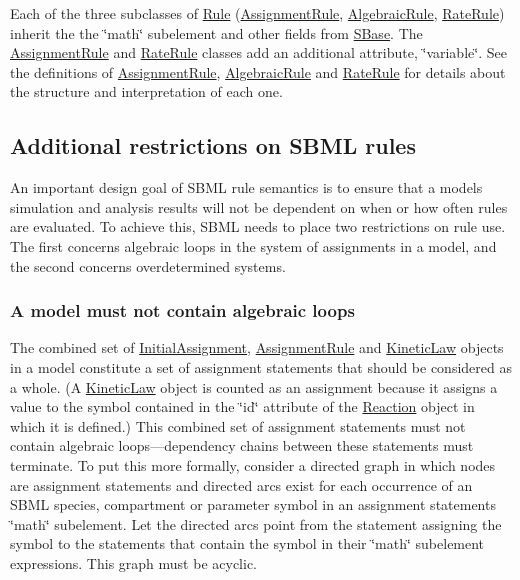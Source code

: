 Each of the three subclasses of \hyperlink{class_rule}{Rule} (\hyperlink{class_assignment_rule}{Assignment\+Rule}, \hyperlink{class_algebraic_rule}{Algebraic\+Rule}, \hyperlink{class_rate_rule}{Rate\+Rule}) inherit the the \char`\"{}math\char`\"{} subelement and other fields from \hyperlink{class_s_base}{S\+Base}. The \hyperlink{class_assignment_rule}{Assignment\+Rule} and \hyperlink{class_rate_rule}{Rate\+Rule} classes add an additional attribute, \char`\"{}variable\char`\"{}. See the definitions of \hyperlink{class_assignment_rule}{Assignment\+Rule}, \hyperlink{class_algebraic_rule}{Algebraic\+Rule} and \hyperlink{class_rate_rule}{Rate\+Rule} for details about the structure and interpretation of each one.\hypertarget{classdoc__rules__general__summary_rules-restrictions}{}\subsection{Additional restrictions on S\+B\+M\+L rules}\label{classdoc__rules__general__summary_rules-restrictions}
An important design goal of S\+B\+ML rule semantics is to ensure that a model\textquotesingle{}s simulation and analysis results will not be dependent on when or how often rules are evaluated. To achieve this, S\+B\+ML needs to place two restrictions on rule use. The first concerns algebraic loops in the system of assignments in a model, and the second concerns overdetermined systems.\hypertarget{classdoc__rules__general__summary_rules-no-loops}{}\subsubsection{A model must not contain algebraic loops}\label{classdoc__rules__general__summary_rules-no-loops}
The combined set of \hyperlink{class_initial_assignment}{Initial\+Assignment}, \hyperlink{class_assignment_rule}{Assignment\+Rule} and \hyperlink{class_kinetic_law}{Kinetic\+Law} objects in a model constitute a set of assignment statements that should be considered as a whole. (A \hyperlink{class_kinetic_law}{Kinetic\+Law} object is counted as an assignment because it assigns a value to the symbol contained in the \char`\"{}id\char`\"{} attribute of the \hyperlink{class_reaction}{Reaction} object in which it is defined.) This combined set of assignment statements must not contain algebraic loops---dependency chains between these statements must terminate. To put this more formally, consider a directed graph in which nodes are assignment statements and directed arcs exist for each occurrence of an S\+B\+ML species, compartment or parameter symbol in an assignment statement\textquotesingle{}s \char`\"{}math\char`\"{} subelement. Let the directed arcs point from the statement assigning the symbol to the statements that contain the symbol in their \char`\"{}math\char`\"{} subelement expressions. This graph must be acyclic.


